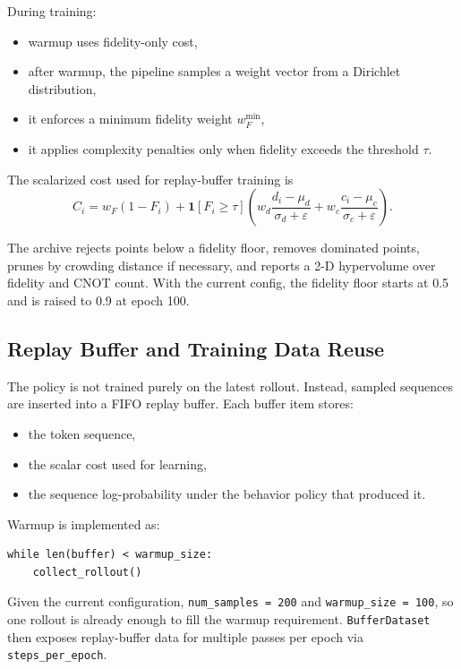 \documentclass[11pt]{article}
\begin{document}
During training:

\begin{itemize}[leftmargin=*]
\item warmup uses fidelity-only cost,
\item after warmup, the pipeline samples a weight vector from a Dirichlet distribution,
\item it enforces a minimum fidelity weight $w_F^{\min}$,
\item it applies complexity penalties only when fidelity exceeds the threshold $\tau$.
\end{itemize}

The scalarized cost used for replay-buffer training is
\[
C_i =
w_F (1 - F_i)
    + \mathbf{1}[F_i \ge \tau]
      \left(
        w_d \frac{d_i - \mu_d}{\sigma_d + \varepsilon}
        +
        w_c \frac{c_i - \mu_c}{\sigma_c + \varepsilon}
      \right).
\]

The archive rejects points below a fidelity floor, removes dominated points, prunes by crowding distance if necessary, and reports a 2-D hypervolume over fidelity and CNOT count. With the current config, the fidelity floor starts at 0.5 and is raised to 0.9 at epoch 100.

\subsection{Replay Buffer and Training Data Reuse}

The policy is not trained purely on the latest rollout. Instead, sampled sequences are inserted into a FIFO replay buffer. Each buffer item stores:

\begin{itemize}[leftmargin=*]
\item the token sequence,
\item the scalar cost used for learning,
\item the sequence log-probability under the behavior policy that produced it.
\end{itemize}

Warmup is implemented as:

\begin{verbatim}
while len(buffer) < warmup_size:
    collect_rollout()
\end{verbatim}

Given the current configuration, \texttt{num\_samples = 200} and \texttt{warmup\_size = 100}, so one rollout is already enough to fill the warmup requirement. \texttt{BufferDataset} then exposes replay-buffer data for multiple passes per epoch via \texttt{steps\_per\_epoch}.
\end{document}
